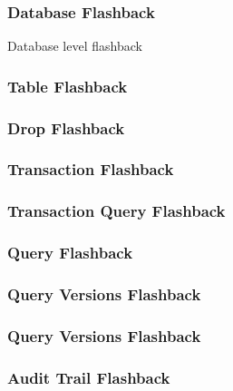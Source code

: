 \subsubsection{Database Flashback}
Database level flashback



\subsubsection{Table Flashback}

\subsubsection{Drop Flashback}

\subsubsection{Transaction Flashback}

\subsubsection{Transaction Query Flashback}

\subsubsection{Query Flashback}

\subsubsection{Query Versions Flashback}

\subsubsection{Query Versions Flashback}

\subsubsection{Audit Trail Flashback}



